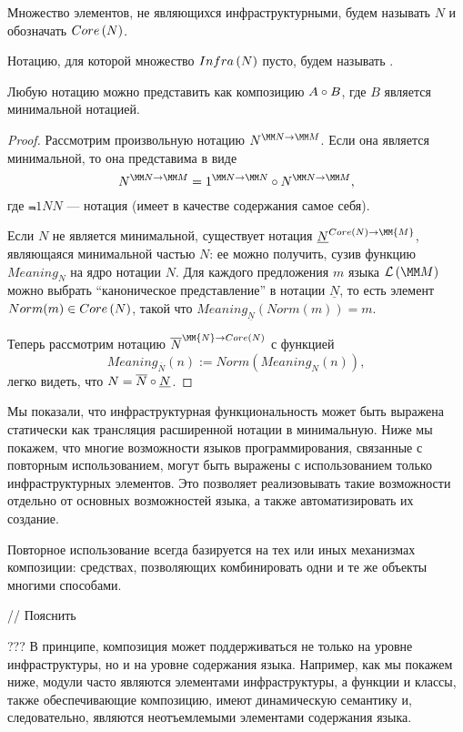 {\begin{Def}
Множество элементов, не являющихся инфраструктурными, будем называть  $N$ и обозначать $Core\left(N\right)$.
\end{Def}

\begin{Def}
	Нотацию, для которой множество $Infra\left(N\right)$ пусто, будем называть .
\end{Def}

\begin{Prop}
	Любую нотацию можно представить как композицию $A \circ B$, где $B$ является минимальной нотацией.
\end{Prop}
\begin{proof}
Рассмотрим произвольную нотацию $\N{N}{M}$. Если она является минимальной, то она представима в виде
	$$\N{N}{M} = \Comp{\Not{1}{N}{N}}{\N{N}{M}},$$
где $\Not{1}{N}{N}$ ---  нотация (имеет в качестве содержания самое себя).

Если $N$ не является минимальной, существует нотация $\NNot{\underline{N}}{\Core{N}}{\MM{M}}$, являющаяся минимальной частью $N$: ее можно получить, сузив функцию $Meaning_N$ на ядро нотации $N$. Для каждого предложения $m$ языка $\LMM{M}$ можно выбрать ``каноническое представление'' в нотации $\underline{N}$, то есть элемент $Norm(m) \in Core\left(N\right)$, такой что $Meaning_{\underline{N}}(Norm(m)) = m$.

Теперь рассмотрим нотацию $\NNot{\overline{N}}{\MM{N}}{\Core{N}}$ с функцией
	$$Meaning_{\overline{N}}(n) := Norm(Meaning_N(n)),$$
легко видеть, что $N = \overline{N} \circ \underline{N}$.
\end{proof}

Мы показали, что инфраструктурная функциональность может быть выражена статически как трансляция расширенной нотации в минимальную.  Ниже мы покажем, что многие возможности языков программирования, связанные с повторным использованием, могут быть выражены с использованием только инфраструктурных элементов. Это позволяет реализовывать такие возможности отдельно от основных возможностей языка, а также автоматизировать их создание.

Повторное использование всегда базируется на тех или иных механизмах композиции: средствах, позволяющих комбинировать одни и те же объекты многими способами.

// Пояснить

??? В принципе, композиция может поддерживаться не только на уровне инфраструктуры, но и на уровне содержания языка. Например, как мы покажем ниже, модули часто являются элементами инфраструктуры, а функции и классы, также обеспечивающие композицию, имеют динамическую семантику и, следовательно, являются неотъемлемыми элементами содержания языка.

}
